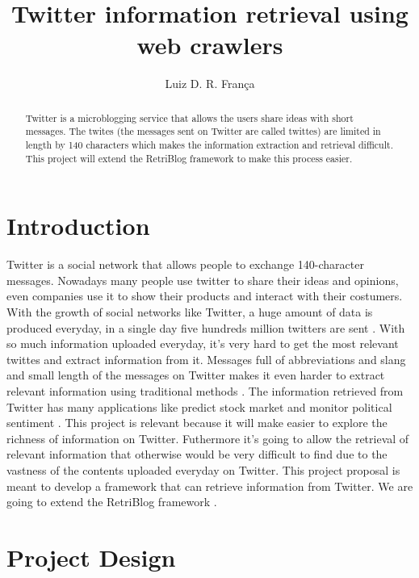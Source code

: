 \documentclass[12pt]{article}
\title{Twitter information retrieval using web crawlers}
\author{Luiz D. R. Fran\c{c}a\inst{1}}
\begin{document}
 

\maketitle

\begin{abstract} 
Twitter is a microblogging service that allows the users share ideas with short messages. The twites (the messages sent on Twitter are called twittes) are limited in length by 140 characters which makes the information extraction and retrieval difficult. This project will extend the RetriBlog framework \cite{Ferreira:13} to make this process easier. 
\end{abstract}

\section{Introduction}
Twitter is a social network that allows people to exchange 140-character messages. Nowadays many people use twitter to share their ideas and opinions, even companies use it to show their products and interact with their costumers. With the growth of social networks like Twitter, a huge amount of data is produced everyday, in a single day five hundreds million twitters are sent \cite{NetLiveStats}.  With so much information uploaded everyday, it's very hard to get the most relevant twittes and extract information from it. Messages full of abbreviations and slang and small length of the messages on Twitter makes it even harder to extract relevant information using traditional methods \cite{Sriram:10}.
\linebreak 
The information retrieved from Twitter has many applications like predict stock market \cite{Bollen:11} and monitor political sentiment \cite{Bermingham:11}. This project is relevant because it will make easier to explore the richness of information on Twitter. Futhermore it's going to allow the retrieval of relevant information that otherwise would be very difficult to find due to the vastness of the contents uploaded everyday on Twitter. 
\linebreak
This project proposal is meant to develop a framework that can retrieve information from Twitter. We are going to extend the RetriBlog framework \cite{Ferreira:13}.

\section{Project Design}
\end{document}
